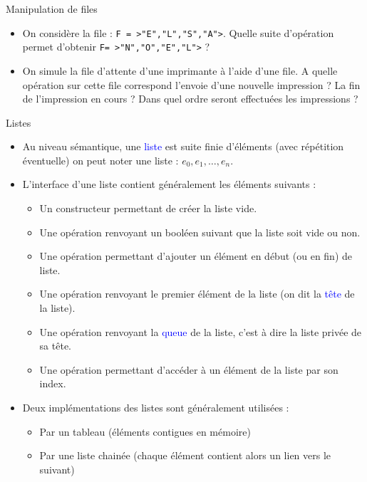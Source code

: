 \documentclass[10pt]{beamer}
\begin{document}
\begin{frame}{\Ctitle}{\stitle}
	\begin{exampleblock}{Manipulation de files}
		\begin{itemize}
			\item<2-> On considère la file : {\tt F = >"E","L","S","A">}. Quelle suite d'opération permet d'obtenir {\tt F= >"N","O","E","L">} ?
			\item<3-> On simule la file d'attente d'une imprimante à l'aide d'une file. A quelle opération sur cette file correspond l'envoie d'une nouvelle impression ? La fin de l'impression en cours ? Dans quel ordre seront effectuées les impressions ?
		\end{itemize}
	\end{exampleblock}
\end{frame}

\begin{frame}{\Ctitle}{\stitle}
	\begin{alertblock}{Listes}
		\begin{itemize}
			\item<1-> Au niveau sémantique, une \textcolor{blue}{liste} est suite finie d'éléments (avec répétition éventuelle) on peut noter une liste : $e_0, e_1, \dots, e_n$.
			\item<2-> L'interface d'une liste contient généralement les éléments suivants :
				\begin{itemize}
					\item<3-> Un constructeur permettant de créer la liste vide.
					\item<4-> Une opération renvoyant un booléen suivant que la liste soit vide ou non.
					\item<5-> Une opération permettant d'ajouter un élément en début (ou en fin) de liste.
					\item<6-> Une opération renvoyant le premier élément de la liste (on dit la \textcolor{blue}{tête} de la liste).
					\item<7-> Une opération renvoyant la \textcolor{blue}{queue} de la liste, c'est à dire la liste privée de sa tête.
					\item<8-> Une opération permettant d'accéder à un élément de la liste par son index.
				\end{itemize}
			\item<9-> Deux implémentations des listes sont généralement utilisées :
				\begin{itemize}
					\item<10-> Par un tableau (éléments contigues en mémoire)
					\item<11-> Par une liste chainée (chaque élément contient alors un lien vers le suivant)
				\end{itemize}
		\end{itemize}
	\end{alertblock}
\end{frame}
\end{document}
